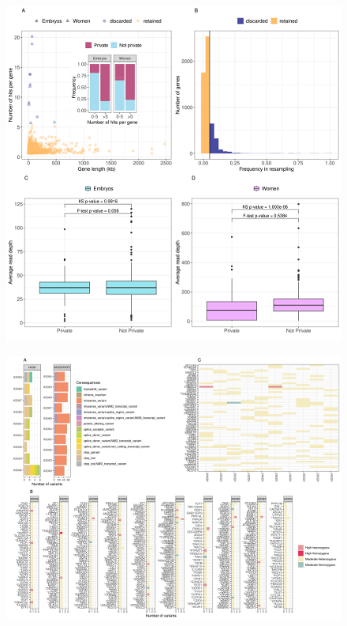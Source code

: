 \begin{figure}[ht]
\centering
\includegraphics[width=\linewidth]{fig/filters_EmbryoWomen.png}
\caption{\textbf{}}
\label{fig:filters}
\end{figure}

\begin{figure}[ht]
\centering
\includegraphics[width=\linewidth]{fig/panel_EmbryoResults.png}
\caption{\textbf{}}
\label{fig:resembryo}
\end{figure}

